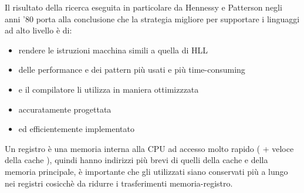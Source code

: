 \documentclass[arch.tex]{subfiles}
\begin{document}
%
\label{par:esito_ricerca}
Il risultato della ricerca eseguita in particolare da Hennessy e Patterson negli anni '80 porta 
alla conclusione che la strategia migliore per supportare i linguaggi ad alto livello è di:

\begin{itemize}
	\item {} rendere le istruzioni macchina simili a quella di HLL
	\item {} delle performance e dei pattern più usati e 
		più time-consuming
	\item {} e il compilatore li utilizza in maniera 
		ottimizzzata
	\item {} accuratamente progettata
	\item {} ed efficientemente implementato
\end{itemize}

%
\label{par:uso_dei_regsitri}
Un registro è una memoria interna alla CPU ad accesso molto rapido ( + veloce della cache ), 
quindi hanno indirizzi più brevi di quelli della cache e della memoria principale,
è importante che gli  utilizzati siano conservati più a lungo nei registri
cosicchè da ridurre i trasferimenti memoria-registro.
\end{document}
